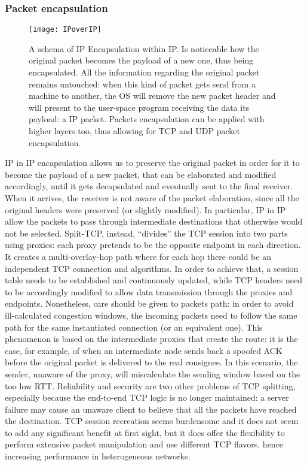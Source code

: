 \subsubsection*{Packet encapsulation}
\begin{figure}[t]
  \centering \texttt{[image: IPoverIP]}
  \caption[IP Encapsulation within IP packet schema]{A schema of IP
    Encapsulation within IP. Is noticeable how the original packet becomes the
    payload of a new one, thus being encapsulated. All the information
    regarding the original packet remains untouched: when this kind of packet
    gets send from a machine to another, the OS will remove the new packet
    header and will present to the user-space program receiving the data its
    payload: a IP packet. Packets encapsulation can be applied with higher
    layers too, thus allowing for TCP and UDP packet encapsulation.}
  \label{chap:prjan:img:ip_over_ip}
\end{figure}
IP in IP encapsulation allows us to preserve the original packet in order for it
to become the payload of a new packet, that can be elaborated and modified
accordingly, until it gets decapsulated and eventually sent to the final
receiver. When it arrives, the receiver is not aware of the packet
elaboration, since all the original headers were preserved (or slightly
modified). In particular, IP in IP allow the packets to pass through
intermediate destinations that otherwise would not be selected. Split-TCP,
instead, ``divides'' the TCP session into two parts using proxies: each proxy
pretends to be the opposite endpoint in each direction. It creates a
multi-overlay-hop path where for each hop there could be an independent TCP
connection and algorithms. In order to achieve that, a session
table needs to be established and continuously updated, while TCP headers need
to be accordingly modified to allow data transmission through the proxies and
endpoints. Nonetheless, care should be given to packets path: in order to avoid
ill-calculated congestion windows, the incoming packets need to follow the same
path for the same instantiated connection (or an equivalent one). This
phenomenon is based on the intermediate proxies that create the route: it is the
case, for example, of when an intermediate node sends back a spoofed ACK before
the original packet is delivered to the real consignee. In this scenario, the
sender, unaware of the proxy, will miscalculate the sending window based on the
too low RTT. Reliability and security are two other problems of TCP splitting,
especially because the end-to-end TCP logic is no longer maintained: a server
failure may cause an unaware client to believe that all the packets have
reached the destination. TCP session recreation seems burdensome and it does not
seem to add any significant benefit at first sight, but it does offer the
flexibility to perform extensive packet manipulation and use different TCP
flavors, hence increasing performance in heterogeneous networks.


